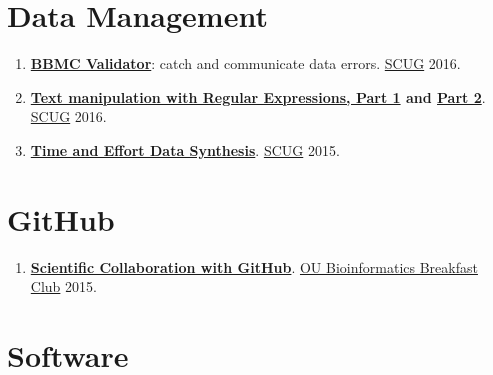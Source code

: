 \documentclass[
]{book}
\providecommand{\tightlist}{%
  \setlength{\itemsep}{0pt}\setlength{\parskip}{0pt}}
\begin{document}
\hypertarget{data-management}{%
\section{Data Management}\label{data-management}}

\begin{enumerate}
\def\labelenumi{\arabic{enumi}.}
\tightlist
\item
  \textbf{\href{https://rawgit.com/OuhscBbmc/StatisticalComputing/master/2016-presentations/11-november/beasley-scug-validator-2016-11.html\#/}{BBMC Validator}}: catch and communicate data errors. \href{https://github.com/OuhscBbmc/StatisticalComputing}{SCUG} 2016.
\item
  \textbf{\href{https://rawgit.com/OuhscBbmc/StatisticalComputing/master/2016-presentations/02-february/beasley-scug-regex-part-1-2016-02.html}{Text manipulation with Regular Expressions, Part 1} and \href{https://rawgit.com/OuhscBbmc/StatisticalComputing/master/2016-presentations/05-may/beasley-scug-regex-part-2-2016-05.html\#/}{Part 2}}. \href{https://github.com/OuhscBbmc/StatisticalComputing}{SCUG} 2016.
\item
  \textbf{\href{https://rawgit.com/wibeasley/RAnalysisSkeleton/master/documentation/time-and-effort-synthesis.html\#/}{Time and Effort Data Synthesis}}. \href{https://github.com/OuhscBbmc/StatisticalComputing}{SCUG} 2015.
\end{enumerate}

\hypertarget{github-2}{%
\section{GitHub}\label{github-2}}

\begin{enumerate}
\def\labelenumi{\arabic{enumi}.}
\tightlist
\item
  \textbf{\href{https://github.com/OuhscBbmc/BbmcResources/blob/master/Publications/Presentation2015-08-GitHub/beasley-github-2015-08.md}{Scientific Collaboration with GitHub}}. \href{https://github.com/bwawrik/MBIO5810}{OU Bioinformatics Breakfast Club} 2015.
\end{enumerate}

\hypertarget{software}{%
\section{Software}\label{software}}
\end{document}
